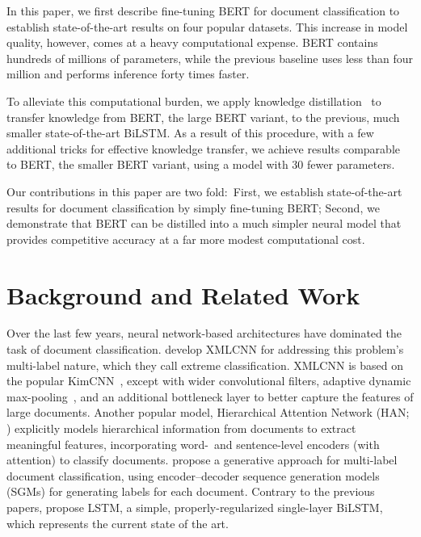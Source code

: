 \documentclass[11pt,a4paper]{article}
\newcommand{\BLSTMR}[1]{LSTM}
\newcommand{\BERTL}[1]{BERT}
\newcommand{\BERTB}[1]{BERT}
\begin{document}
In this paper, we first describe fine-tuning BERT for document classification to establish state-of-the-art results on four popular datasets.
This increase in model quality, however, comes at a heavy computational expense.
BERT contains hundreds of millions of parameters, while the previous baseline uses less than four million and performs inference forty times faster.

To alleviate this computational burden, we apply knowledge distillation~\cite{hintonkd} to transfer knowledge from \BERTL{}, the large BERT variant, to the previous, much smaller state-of-the-art BiLSTM.
As a result of this procedure, with a few additional tricks for effective knowledge transfer, we achieve results comparable to \BERTB{}, the smaller BERT variant, using a model with 30 fewer parameters.

Our contributions in this paper are two fold:\
First, we establish state-of-the-art results for document classification by simply fine-tuning BERT;
Second, we demonstrate that BERT can be distilled into a much simpler neural model that provides competitive accuracy at a far more modest computational cost.

\section{Background and Related Work}

Over the last few years, neural network-based architectures have dominated the task of document classification.
\citet{liu2017deep} develop XMLCNN for addressing this problem's multi-label nature, which they call extreme classification.
XMLCNN is based on the popular KimCNN~\cite{kim2014convolutional}, except with wider convolutional filters, adaptive dynamic max-pooling~\cite{chendynamicpool, Johnsondynamicpool}, and an additional bottleneck layer to better capture the features of large documents.
Another popular model, Hierarchical Attention Network (HAN; \citealp{yang2016hierarchical}) explicitly models hierarchical information from documents to extract meaningful features, incorporating word-~and sentence-level encoders (with attention) to classify documents.
\citet{yang2018sgm} propose a generative approach for multi-label document classification, using encoder--decoder sequence generation models (SGMs) for generating labels for each document.
Contrary to the previous papers, \citet{adhikari2019rethinking} propose \BLSTMR{}, a simple, properly-regularized single-layer BiLSTM, which represents the current state of the art.
\end{document}
